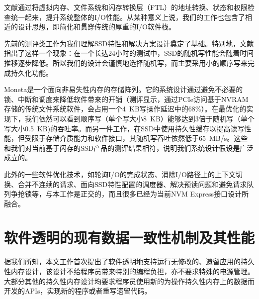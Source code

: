 文献\cite{Huang:2015:UAT:2749469.2750420}通过将虚拟内存、文件系统和闪存转换层（FTL）的地址转换、状态和权限检查统一起来，提升系统整体的I/O性能。从某种意义上说，我们的工作也包含了相近的设计思想，即简化和贯穿传统的厚重的I/O软件栈。

先前的测评类工作\cite{Stoica:2009:ERW:1565694.1565697,Chen:2009:UIC:1555349.1555371,Jung:2013:RWH:2465529.2465548}为我们理解SSD特性和解决方案设计奠定了基础。特别地，文献
\cite{Stoica:2009:ERW:1565694.1565697}指出了这样一个现象：在一个长达24小时的测试中，SSD的随机写性能会随着时间推移逐步降低。所以我们的设计会谨慎地选择随机写，而主要采用小的顺序写来完成持久化功能。

Moneta\cite{Caulfield:2010:MHS:1934902.1934984}是一个面向非易失性内存的存储阵列。它的系统设计通过避免不必要的锁、中断和调度来降低软件带来的开销（测评显示，通过PCIe访问基于NVRAM存储的传统文件系统软件，会占用一个4~KB写操作延迟中的68\%）。在最优化的实现下，我们依然可以看到顺序写（单个写大小8~KB）能够达到3倍于随机写（单个写大小0.5~KB)的吞吐率。而另一件工作\cite{Kang:2014:DWC:2588555.2595632}，在SSD中使用持久性缓存以提高读写性能，但受限于存储介质能力和软件接口，其随机写吞吐依然低于65~MB/s。这些和我们对当前基于闪存的SSD产品的测评结果相符，说明我们系统设计假设是广泛成立的。

此外的一些软件优化技术\cite{Yu:2014:OBI:2642648.2619092}，如轮询I/O的完成状态、消除I/O路径上的上下文切换、合并不连续的请求、面向SSD特性配置的调度器、解决预读问题和避免请求队列争抢锁等，与本工作是正交的，而且很多已经为当前NVM Express接口设计所融合。

\section{软件透明的现有数据一致性机制及其性能}

据我们所知，本文工作首次提出了软件透明地支持运行无修改的、遗留应用的持久性内存设计，该设计不给程序员带来特别的编程负担，亦不要求特殊的电源管理。大部分其他的持久性内存设计\cite{Volos:2011:MLP:1950365.1950379,
Coburn:2011:NMP:1950365.1950380,
Venkataraman:2011:CDD:1960475.1960480, Intel:PMEM, SNIA:2013:NPM,
Zhao:2013:KCP:2540708.2540744, Moraru:2013:CDS, Kannan:2014:RCP,
Liu:2014:NDU:2541940.2541957, Pelley:2014:MP}均要求程序员使用新的为操作持久性内存上的数据而开发的APIs，实现新的程序或者重写遗留代码。


